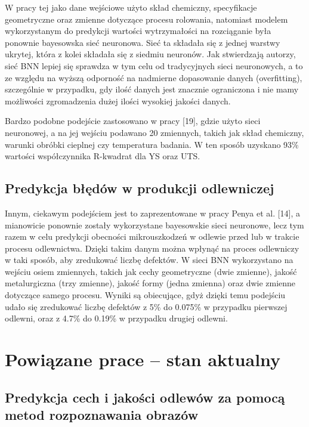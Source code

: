 \noindent W pracy tej jako dane wejściowe użyto skład chemiczny, specyfikacje geometryczne oraz zmienne dotyczące procesu rolowania, natomiast modelem wykorzystanym do predykcji wartości wytrzymałości na rozciąganie była ponownie bayesowska sieć neuronowa. Sieć ta składała się z jednej warstwy ukrytej, która z kolei składała się z siedmiu neuronów. Jak stwierdzają autorzy, sieć BNN lepiej się sprawdza w tym celu od tradycyjnych sieci neuronowych, a to ze względu na wyższą odporność na nadmierne dopasowanie danych (overfitting), szczególnie w przypadku, gdy ilość danych jest znacznie ograniczona i nie mamy możliwości zgromadzenia dużej ilości wysokiej jakości danych.
    
Bardzo podobne podejście zastosowano w pracy [19], gdzie użyto sieci neuronowej, a na jej wejściu podawano 20 zmiennych, takich jak skład chemiczny, warunki obróbki cieplnej czy temperatura badania. W ten sposób uzyskano 93\% wartości współczynnika R-kwadrat dla YS oraz UTS.

\subsection{Predykcja błędów w produkcji odlewniczej}
\label{cha2.1.3}

Innym, ciekawym podejściem jest to zaprezentowane w pracy Penya et al. [14], a mianowicie ponownie zostały wykorzystane bayesowskie sieci neuronowe, lecz tym razem w celu predykcji obecności mikrouszkodzeń w odlewie przed lub w trakcie procesu odlewnictwa. Dzięki takim danym można wpłynąć na proces odlewniczy w taki sposób, aby zredukować liczbę defektów. W sieci BNN wykorzystano na wejściu osiem zmiennych, takich jak cechy geometryczne (dwie zmienne), jakość metalurgiczna (trzy zmienne), jakość formy (jedna zmienna) oraz dwie zmienne dotyczące samego procesu. Wyniki są obiecujące, gdyż dzięki temu podejściu udało się zredukować liczbę defektów z 5\% do 0.075\% w przypadku pierwszej odlewni, oraz z 4.7\% do 0.19\% w przypadku drugiej odlewni.

\section{Powiązane prace – stan aktualny}
\label{cha2.2}

\subsection{Predykcja cech i jakości odlewów za pomocą metod rozpoznawania obrazów}
\label{cha2.2.1}

